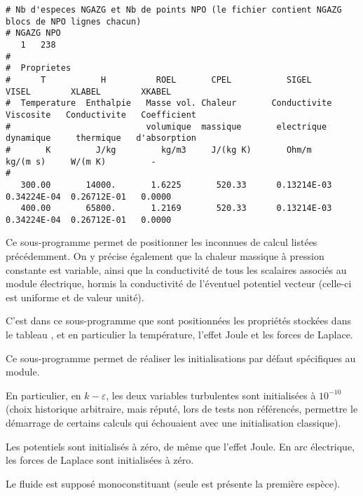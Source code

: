 {\scriptsize
\begin{verbatim}
# Nb d'especes NGAZG et Nb de points NPO (le fichier contient NGAZG blocs de NPO lignes chacun)
# NGAZG NPO
   1   238
#
#  Proprietes
#      T           H          ROEL       CPEL           SIGEL        VISEL        XLABEL        XKABEL
#  Temperature  Enthalpie   Masse vol. Chaleur       Conductivite  Viscosite   Conductivite   Coefficient
#                           volumique  massique       electrique   dynamique     thermique   d'absorption
#       K         J/kg         kg/m3     J/(kg K)       Ohm/m        kg/(m s)     W/(m K)         -
#
   300.00       14000.       1.6225       520.33      0.13214E-03  0.34224E-04  0.26712E-01   0.0000
   400.00       65800.       1.2169       520.33      0.13214E-03  0.34224E-04  0.26712E-01   0.0000
\end{verbatim}
}



Ce sous-programme permet de positionner les inconnues de calcul list\'ees
pr\'ec\'edemment. On y pr\'ecise \'egalement que la chaleur massique \`a
pression constante est variable, ainsi que la conductivit\'e de tous les
scalaires associ\'es au module \'electrique, hormis la conductivit\'e de
l'\'eventuel potentiel vecteur (celle-ci est uniforme et de valeur unit\'e).



C'est dans ce sous-programme que sont positionn\'ees les propri\'et\'es stock\'ees
dans le tableau , et en particulier la temp\'erature, l'effet Joule
et les forces de Laplace.


Ce sous-programme permet de r\'ealiser les initialisations par d\'efaut
sp\'ecifiques au module.

En particulier, en $k-\varepsilon$, les deux variables
turbulentes sont initialis\'ees \`a $10^{-10}$ (choix historique arbitraire,
mais r\'eput\'e, lors de tests non r\'ef\'erenc\'es, permettre le d\'emarrage de
certains calculs qui \'echouaient avec une initialisation classique).

Les potentiels sont initialis\'es \`a z\'ero, de m\^eme que l'effet Joule. En
arc \'electrique, les forces de Laplace sont initialis\'ees \`a z\'ero.

Le fluide est suppos\'e monoconstituant (seule est pr\'esente la premi\`ere
esp\`ece).


